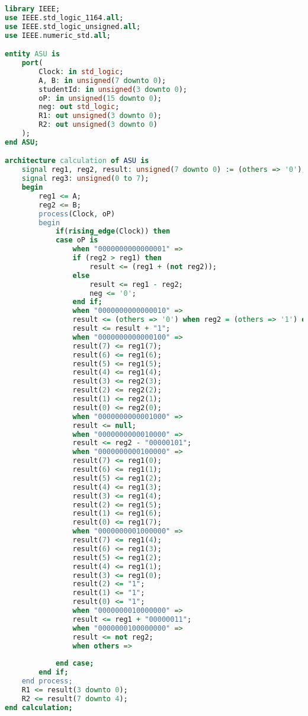 \begin{lstlisting}[language=VHDL, caption={VHDL code for the Modified ALU}]
library IEEE;
use IEEE.std_logic_1164.all;
use IEEE.std_logic_unsigned.all;
use IEEE.numeric_std.all;

entity ASU is
    port(
        Clock: in std_logic;
        A, B: in unsigned(7 downto 0);
        studentId: in unsigned(3 downto 0);
        oP: in unsigned(15 downto 0);
        neg: out std_logic;
        R1: out unsigned(3 downto 0);
        R2: out unsigned(3 downto 0)
    );
end ASU;

architecture calculation of ASU is
    signal reg1, reg2, result: unsigned(7 downto 0) := (others => '0');
    signal reg3: unsigned(0 to 7);
    begin
        reg1 <= A;
        reg2 <= B;
        process(Clock, oP)
        begin
            if(rising_edge(Clock)) then 
            case oP is
                when "0000000000000001" =>
                if (reg2 > reg1) then
                    result <= (reg1 + (not reg2));
                else
                    result <= reg1 - reg2;
                    neg <= '0';
                end if;
                when "0000000000000010" =>
                result <= (others => '0') when reg2 = (others => '1') else not reg2;
                result <= result + "1";
                when "0000000000000100" =>
                result(7) <= reg1(7);
                result(6) <= reg1(6);
                result(5) <= reg1(5);
                result(4) <= reg1(4);
                result(3) <= reg2(3);
                result(2) <= reg2(2);
                result(1) <= reg2(1);
                result(0) <= reg2(0);
                when "0000000000001000" =>
                result <= null;
                when "0000000000010000" =>
                result <= reg2 - "00000101";
                when "0000000000100000" =>
                result(7) <= reg1(0);
                result(6) <= reg1(1);
                result(5) <= reg1(2);
                result(4) <= reg1(3);
                result(3) <= reg1(4);
                result(2) <= reg1(5);
                result(1) <= reg1(6);
                result(0) <= reg1(7);
                when "0000000001000000" =>
                result(7) <= reg1(4);
                result(6) <= reg1(3);
                result(5) <= reg1(2);
                result(4) <= reg1(1);
                result(3) <= reg1(0);
                result(2) <= "1";
                result(1) <= "1";
                result(0) <= "1";
                when "0000000010000000" =>
                result <= reg1 + "00000011";
                when "0000000100000000" =>
                result <= not reg2;
                when others =>
                
            end case;
        end if;
    end process;
    R1 <= result(3 downto 0);
    R2 <= result(7 downto 4);
end calculation;  
\end{lstlisting}